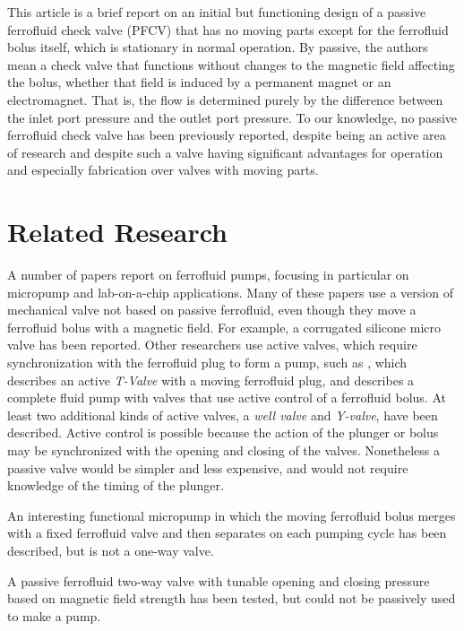 \documentclass[]{asme2ej}
\begin{document}
This article is a brief report on an initial but functioning design of a
passive ferrofluid check valve (PFCV) that has no moving
parts except for the ferrofluid bolus itself, which is stationary
in normal operation.
By passive, the authors
mean a check valve that functions without changes to the magnetic
field affecting the bolus, whether that field is induced by a
permanent magnet or an electromagnet.
That is, the flow is determined
purely by the difference between the inlet port pressure and the
outlet port pressure.
To our knowledge, no passive
ferrofluid check valve has been previously reported, despite being an
active area of research and despite such a valve having
significant advantages for operation and especially
fabrication over valves with moving parts.

\section{Related Research}

A number of papers report on ferrofluid pumps, focusing in particular
on micropump and lab-on-a-chip applications\cite{ozbey2015modeling,hsu2018biocompatible}.
Many of these papers use
a version of mechanical valve not based on passive
ferrofluid, even though they move a ferrofluid bolus
with a magnetic field.
For example,
a corrugated silicone micro valve\cite{yamahata2003ferrofluid,yamahata2005plastic}
has been reported.
Other researchers use active valves, which require synchronization with
the ferrofluid plug to form a pump,
such as \cite{menz2000fluidic}, which
describes an active {\em T-Valve} with a moving ferrofluid plug, and
\cite{ando2009ferrofluidic} describes a complete fluid pump with valves
that use
active control of a ferrofluid bolus.
At least two additional kinds of active valves, a {\em well valve} and
{\em Y-valve}, have
been described\cite{hartshorne2004ferrofluid}.
Active control is possible because the
action of the plunger or bolus may be synchronized with the opening and closing
of the valves.
Nonetheless a passive valve would be simpler and less
expensive, and would not require knowledge of the timing of the
plunger.

An interesting functional micropump in which the
moving ferrofluid bolus merges with a fixed ferrofluid valve and then
separates on each pumping cycle has been described\cite{hatch2001ferrofluidic},
but is not a one-way valve.

A passive ferrofluid two-way valve with tunable
opening and closing pressure based on magnetic
field strength\cite{paschalis2013novel} has been tested,
but could not be passively used to make a pump.
\end{document}
